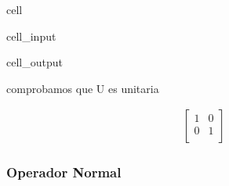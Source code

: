 \documentclass[letterpaper,10pt,english]{jupyterBook}
\begin{document}
\begin{sphinxuseclass}{cell}\begin{sphinxVerbatimInput}

\begin{sphinxuseclass}{cell_input}
\begin{sphinxVerbatim}[commandchars=\\\{\}]

\end{sphinxVerbatim}

\end{sphinxuseclass}\end{sphinxVerbatimInput}
\begin{sphinxVerbatimOutput}

\begin{sphinxuseclass}{cell_output}
\begin{sphinxVerbatim}[commandchars=\\\{\}]
comprobamos que U es unitaria
\end{sphinxVerbatim}
\begin{equation*}
\begin{split}\begin{bmatrix}
1 & 0  \\
 0 & 1  \\
 \end{bmatrix}
\end{split}
\end{equation*}
\end{sphinxuseclass}\end{sphinxVerbatimOutput}

\end{sphinxuseclass}

\subsubsection{Operador Normal}
\label{\detokenize{docs/Part_01_Formalismo/Chapter_01_02_Formalismo_matem_xe1tico/01_03_Operadores_myst:operador-normal}}
\sphinxAtStartPar
\end{document}
